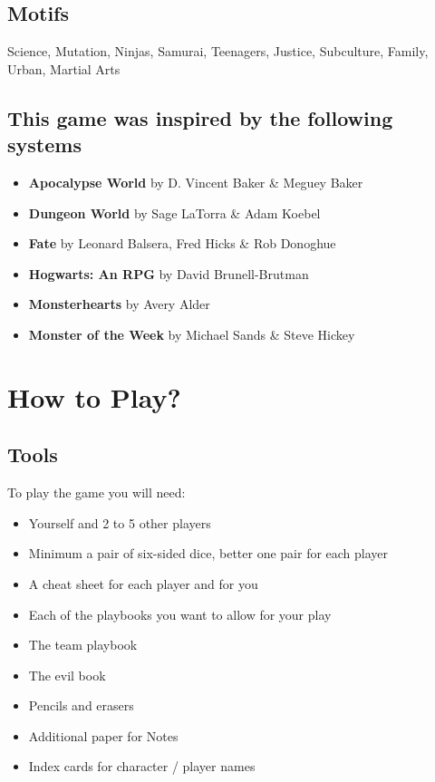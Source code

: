 \documentclass{book}
\begin{document}
\section*{Motifs}
Science, Mutation, Ninjas, Samurai, Teenagers, Justice, Subculture, Family, Urban, Martial Arts

\section*{This game was inspired by the following systems}
\begin{itemize}
    \item \textbf{Apocalypse World} by D. Vincent Baker \& Meguey Baker
    \item \textbf{Dungeon World} by Sage LaTorra \& Adam Koebel
    \item \textbf{Fate} by Leonard Balsera, Fred Hicks \& Rob Donoghue
    \item \textbf{Hogwarts: An RPG} by David Brunell-Brutman
    \item \textbf{Monsterhearts} by Avery Alder
    \item \textbf{Monster of the Week} by Michael Sands \& Steve Hickey
\end{itemize}

\chapter*{How to Play?}
\section*{Tools}
To play the game you will need:
\begin{itemize}
    \item Yourself and 2 to 5 other players
    \item Minimum a pair of six-sided dice, better one pair for each player
    \item A cheat sheet for each player and for you
    \item Each of the playbooks you want to allow for your play
    \item The team playbook
    \item The evil book
    \item Pencils and erasers
    \item Additional paper for Notes
    \item Index cards for character / player names
\end{itemize}
\end{document}
